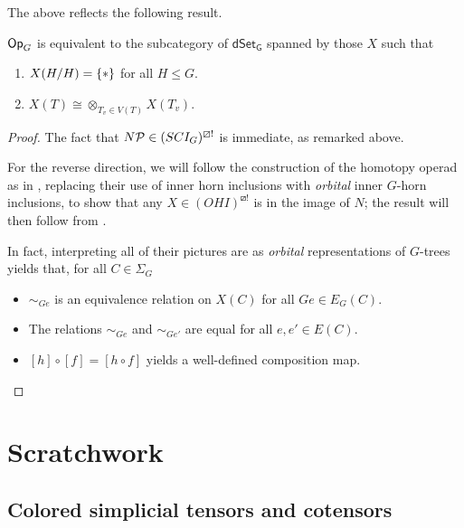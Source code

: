 \documentclass[a4paper,10pt
,draft
]{article}%
\begin{document}
The above reflects the following result.

\begin{proposition}
      $\Op_G$ is equivalent to the subcategory of $\mathsf{dSet_G}$ spanned by those $X$ such that
      \begin{enumerate}
      \item $X(H/H) = \set{\**}$ for all $H \leq G$.
      \item $X(T) \cong \otimes_{T_v \in V(T)}X(T_v)$. 
      \end{enumerate}
\end{proposition}
\begin{proof}
      The fact that $N\P \in (SCI_G)^{\boxslash !}$ is immediate, as remarked above.

      For the reverse direction, we will follow the construction of the homotopy operad as in \cite[\S 6]{MW09},
      replacing their use of inner horn inclusions with \textit{orbital} inner $G$-horn inclusions,
      to show that any $X \in (OHI)^{\boxslash !}$ is in the image of $N$; 
      the result will then follow from \cite[HYPER PROP]{BP18}.

      In fact, interpreting all of their pictures are as \textit{orbital} representations of $G$-trees yields that,
      for all $C \in \Sigma_G$
      \begin{itemize}
      \item $\sim_{G e}$ is an equivalence relation on $X(C)$ for all $Ge \in E_G(C)$.
      \item The relations $\sim_{G e}$ and $\sim_{G e'}$ are equal for all $e,e'\in E(C)$.
      \item $[h] \circ [f] = [h \circ f]$ yields a well-defined composition map. 
      \end{itemize}
\end{proof}



\newpage



\section{Scratchwork}

\subsection{Colored simplicial tensors and cotensors}





{}




\end{document}
